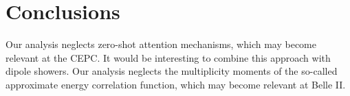 \section{Conclusions}\label{sec:conclusions}

Our analysis neglects zero-shot attention mechanisms, which may become
relevant at the CEPC. It would be interesting to combine this approach
with dipole showers. Our analysis neglects the multiplicity moments of
the so-called approximate energy correlation function, which may become
relevant at Belle II.

